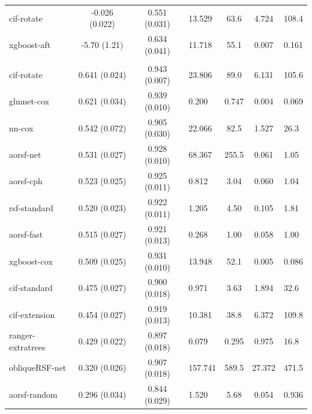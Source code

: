 \documentclass[twoside,11pt]{article}\usepackage[]{graphicx}\usepackage[]{xcolor}
\newenvironment{knitrout}{}{} %
\begin{document}
\begin{knitrout}
\begin{longtable}{lcclccl}
\hspace{1em}cif-rotate & -0.026 (0.022) & 0.551 (0.031) & 13.529 & 63.6 & 4.724 & 108.4\\
\hspace{1em}xgboost-aft & -5.70 (1.21) & 0.634 (0.041) & 11.718 & 55.1 & 0.007 & 0.161\\
\addlinespace[0.3em]
\hline
\multicolumn{7}{l}{\textit{\textbf{Movies released in 2015-2018; gross 1M USD, n = 551, p = 46}}}\\
\hline
\hspace{1em}cif-rotate & 0.641 (0.024) & 0.943 (0.007) & 23.806 & 89.0 & 6.131 & 105.6\\
\hspace{1em}glmnet-cox & 0.621 (0.034) & 0.939 (0.010) & 0.200 & 0.747 & 0.004 & 0.069\\
\hspace{1em}nn-cox & 0.542 (0.072) & 0.905 (0.030) & 22.066 & 82.5 & 1.527 & 26.3\\
\hspace{1em}aorsf-net & 0.531 (0.027) & 0.928 (0.010) & 68.367 & 255.5 & 0.061 & 1.05\\
\hspace{1em}aorsf-cph & 0.523 (0.025) & 0.925 (0.011) & 0.812 & 3.04 & 0.060 & 1.04\\
\hspace{1em}rsf-standard & 0.520 (0.023) & 0.922 (0.011) & 1.205 & 4.50 & 0.105 & 1.81\\
\hspace{1em}aorsf-fast & 0.515 (0.027) & 0.921 (0.013) & 0.268 & 1.00 & 0.058 & 1.00\\
\hspace{1em}xgboost-cox & 0.509 (0.025) & 0.931 (0.010) & 13.948 & 52.1 & 0.005 & 0.086\\
\hspace{1em}cif-standard & 0.475 (0.027) & 0.900 (0.018) & 0.971 & 3.63 & 1.894 & 32.6\\
\hspace{1em}cif-extension & 0.454 (0.027) & 0.919 (0.013) & 10.381 & 38.8 & 6.372 & 109.8\\
\hspace{1em}ranger-extratrees & 0.429 (0.022) & 0.897 (0.018) & 0.079 & 0.295 & 0.975 & 16.8\\
\hspace{1em}obliqueRSF-net & 0.320 (0.026) & 0.907 (0.018) & 157.741 & 589.5 & 27.372 & 471.5\\
\hspace{1em}aorsf-random & 0.296 (0.034) & 0.844 (0.029) & 1.520 & 5.68 & 0.054 & 0.936\\

\end{longtable}
\end{knitrout}
\end{document}

